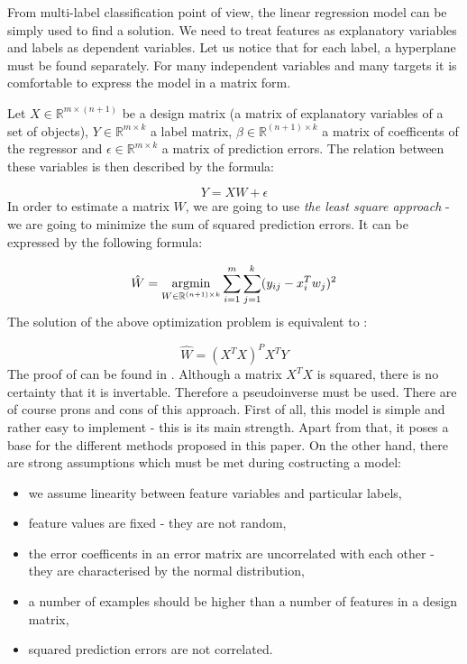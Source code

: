 From multi-label classification point of view, the linear regression model can be simply used to find a solution. We need to treat features as explanatory variables and labels as dependent variables. Let us notice that for each label, a hyperplane must be found separately. For many independent variables and many targets it is comfortable to express the model in a matrix form.  

Let $X \in \mathbb{R}^{m \times  ( n+1 )}$ be a design matrix (a matrix of explanatory variables of a set of objects), $Y \in \mathbb{R}^{m \times k}$ a label matrix, $\beta \in \mathbb{R}^{(n+1) \times k}$ a matrix of coefficents of the regressor and $\epsilon \in \mathbb{R}^{m \times k}$ a matrix of prediction errors. The relation between these variables is then described by the formula:

\begin{equation}\label{eq:LR1}
    Y = XW + \epsilon 
\end{equation}
In order to estimate a matrix $W$, we are going to use \textit{the least square approach} - we are going to minimize the sum of squared prediction errors. It can be expressed by the following formula:

\begin{equation}\label{eq:LR2}
    \hat{W} = \operatorname*{argmin}_{W \in \mathbb{R}^{(n+1) \times k}}\sum\limits_{i=1}^{m}\sum\limits_{j=1}^{k}(y_{ij}-x^T_iw_j)^2
\end{equation}
The solution of the above optimization problem is equivalent to \cite{Weisberg}:

\begin{equation}\label{eq:LR3}
    \hat{W} = (X^TX)^{P}X^TY
\end{equation}
The proof of  can be found in . Although a matrix $X^TX$ is squared, there is no certainty that it is invertable. Therefore a pseudoinverse must be used. There are of course prons and cons of this approach. First of all, this model is simple and rather easy to implement - this is its main strength. Apart from that, it poses a base for the different methods proposed in this paper. On the other hand, there are strong assumptions which must be met during costructing a model:

\begin{itemize}
    \item we assume linearity between feature variables and particular labels,
    \item feature values are fixed - they are not random,
    \item the error coefficents in an error matrix are uncorrelated with each other - they are characterised by the normal distribution,
    \item a number of examples should be higher than a number of features in a design matrix,
    \item squared prediction errors are not correlated.
\end{itemize}

